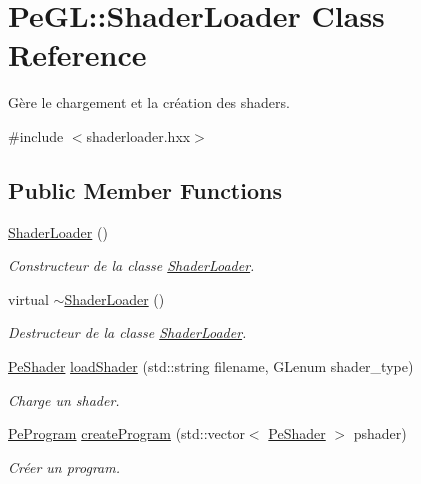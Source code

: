 \hypertarget{classPeGL_1_1ShaderLoader}{\section{Pe\-G\-L\-:\-:Shader\-Loader Class Reference}
\label{classPeGL_1_1ShaderLoader}
}


Gère le chargement et la création des shaders.  




{\ttfamily \#include $<$shaderloader.\-hxx$>$}

\subsection*{Public Member Functions}
\begin{DoxyCompactItemize}
\item 
\hypertarget{classPeGL_1_1ShaderLoader_a0a5819c67a0b8c67e527cc08f9b84801}{\hyperlink{classPeGL_1_1ShaderLoader_a0a5819c67a0b8c67e527cc08f9b84801}{Shader\-Loader} ()}\label{classPeGL_1_1ShaderLoader_a0a5819c67a0b8c67e527cc08f9b84801}

\begin{DoxyCompactList}\small\item\em Constructeur de la classe \hyperlink{classPeGL_1_1ShaderLoader}{Shader\-Loader}. \end{DoxyCompactList}\item 
\hypertarget{classPeGL_1_1ShaderLoader_a9756797fe15fc10a8616e1e1984f46ea}{virtual \hyperlink{classPeGL_1_1ShaderLoader_a9756797fe15fc10a8616e1e1984f46ea}{$\sim$\-Shader\-Loader} ()}\label{classPeGL_1_1ShaderLoader_a9756797fe15fc10a8616e1e1984f46ea}

\begin{DoxyCompactList}\small\item\em Destructeur de la classe \hyperlink{classPeGL_1_1ShaderLoader}{Shader\-Loader}. \end{DoxyCompactList}\item 
\hyperlink{structPeGL_1_1PeShader}{Pe\-Shader} \hyperlink{classPeGL_1_1ShaderLoader_a74c1e46b5637ef5a22544cee5947201f}{load\-Shader} (std\-::string filename, G\-Lenum shader\-\_\-type)
\begin{DoxyCompactList}\small\item\em Charge un shader. \end{DoxyCompactList}\item 
\hyperlink{structPeGL_1_1PeProgram}{Pe\-Program} \hyperlink{classPeGL_1_1ShaderLoader_a0570f0dd3e3e87a5016b41684b54bd0a}{create\-Program} (std\-::vector$<$ \hyperlink{structPeGL_1_1PeShader}{Pe\-Shader} $>$ pshader)
\begin{DoxyCompactList}\small\item\em Créer un program. \end{DoxyCompactList}\end{DoxyCompactItemize}


